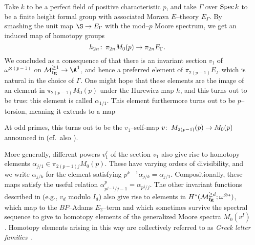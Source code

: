 \begin{example}
Take $k$ to be a perfect field of positive characteristic $p$, and take $\Gamma$ over $\operatorname{Spec} k$ to be a finite height formal group with associated Morava $E$--theory $E_\Gamma$.  By smashing the unit map $\S \to E_\Gamma$ with the mod--$p$ Moore spectrum, we get an induced map of homotopy groups \[h_{2n}\colon\thinspace \pi_{2n} M_0(p) \to \pi_{2n} E_\Gamma.\]  We concluded as a consequence of  that there is an invariant section $v_1$ of $\omega^{\otimes(p-1)}$ on $\moduli{fg}^{\ge 1} \to \A^1$, and hence a preferred element of $\pi_{2(p-1)} E_\Gamma$ which is natural in the choice of $\Gamma$.  One might hope that these elements are the image of an element in $\pi_{2(p-1)} M_0(p)$ under the Hurewicz map $h$, and this turns out to be true: this element is called $\alpha_{1/1}$.  This element furthermore turns out to be $p$--torsion, meaning it extends to a map
\begin{center}
\end{center}
At odd primes, this turns out to be the $v_1$--self-map $v\colon\thinspace M_{2(p-1)}(p) \to M_0(p)$ announced in  (cf.\ also \cite[Proposition 12.7]{AdamsJXIV}).

More generally, different powers $v_1^j$ of the section $v_1$ also give rise to homotopy elements $\alpha_{j/1} \in \pi_{2(p-1)j} M_0(p)$.  These have varying orders of divisibility, and we write $\alpha_{j/k}$ for the element satisfying $p^{k-1} \alpha_{j/k} = \alpha_{j/1}$.  Compositionally, these maps satisfy the useful relation $\alpha_{p^{j-1}/j-1}^p = \alpha_{p^j/j}$.
The other invariant functions described in  (e.g., $v_d$ modulo $I_d$) also give rise to elements in $H^*(\mathcal{M}_{\mathbf{fg}}^{\ge d}; \omega^{\otimes *})$, which map to the $BP$--Adams $E_2$--term and which sometimes survive the spectral sequence to give to homotopy elements of the generalized Moore spectra $M_0(v^I)$.  Homotopy elements arising in this way are collectively referred to as \textit{Greek letter families}~\cite[Section 3]{MRW}.
\end{example}

